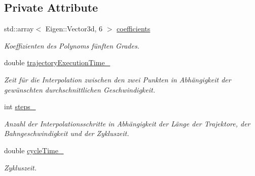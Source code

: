 \subsection*{Private Attribute}
\begin{DoxyCompactItemize}
\item 
\hypertarget{classLineTrajectory_a560c794ebfff602aad735b931c132963}{std\-::array$<$ Eigen\-::\-Vector3d, 6 $>$ \hyperlink{classLineTrajectory_a560c794ebfff602aad735b931c132963}{coefficients}}\label{classLineTrajectory_a560c794ebfff602aad735b931c132963}

\begin{DoxyCompactList}\small\item\em Koeffizienten des Polynoms fünften Grades. \end{DoxyCompactList}\item 
\hypertarget{classLineTrajectory_a983b6fea1e70c24aa8d1aa7770d3ff66}{double \hyperlink{classLineTrajectory_a983b6fea1e70c24aa8d1aa7770d3ff66}{trajectory\-Execution\-Time\-\_\-}}\label{classLineTrajectory_a983b6fea1e70c24aa8d1aa7770d3ff66}

\begin{DoxyCompactList}\small\item\em Zeit für die Interpolation zwischen den zwei Punkten in Abhängigkeit der gewünschten durchschnittlichen Geschwindigkeit. \end{DoxyCompactList}\item 
\hypertarget{classLineTrajectory_a763e4b203bed598f8e258bada6a1a008}{int \hyperlink{classLineTrajectory_a763e4b203bed598f8e258bada6a1a008}{steps\-\_\-}}\label{classLineTrajectory_a763e4b203bed598f8e258bada6a1a008}

\begin{DoxyCompactList}\small\item\em Anzahl der Interpolationsschritte in Abhängigkeit der Länge der Trajektore, der Bahngeschwindigkeit und der Zykluszeit. \end{DoxyCompactList}\item 
\hypertarget{classLineTrajectory_a14bddd082451c9c5a33141d9fa6816f6}{double \hyperlink{classLineTrajectory_a14bddd082451c9c5a33141d9fa6816f6}{cycle\-Time\-\_\-}}\label{classLineTrajectory_a14bddd082451c9c5a33141d9fa6816f6}

\begin{DoxyCompactList}\small\item\em Zykluszeit. \end{DoxyCompactList}\end{DoxyCompactItemize}
